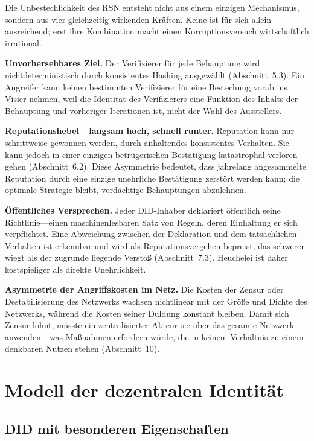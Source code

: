 \documentclass[11pt,a4paper,twocolumn]{article}
\begin{document}
Die Unbestechlichkeit des RSN entsteht nicht aus einem einzigen Mechanismus, sondern aus vier gleichzeitig wirkenden Kräften. Keine ist für sich allein ausreichend; erst ihre Kombination macht einen Korruptionsversuch wirtschaftlich irrational.

\textbf{Unvorhersehbares Ziel.} Der Verifizierer für jede Behauptung wird nichtdeterministisch durch konsistentes Hashing ausgewählt (Abschnitt~5.3). Ein Angreifer kann keinen bestimmten Verifizierer für eine Bestechung vorab ins Visier nehmen, weil die Identität des Verifizierers eine Funktion des Inhalts der Behauptung und vorheriger Iterationen ist, nicht der Wahl des Ausstellers.

\textbf{Reputationshebel---langsam hoch, schnell runter.} Reputation kann nur schrittweise gewonnen werden, durch anhaltendes konsistentes Verhalten. Sie kann jedoch in einer einzigen betrügerischen Bestätigung katastrophal verloren gehen (Abschnitt~6.2). Diese Asymmetrie bedeutet, dass jahrelang angesammelte Reputation durch eine einzige unehrliche Bestätigung zerstört werden kann; die optimale Strategie bleibt, verdächtige Behauptungen abzulehnen.

\textbf{Öffentliches Versprechen.} Jeder DID-Inhaber deklariert öffentlich seine Richtlinie---einen maschinenlesbaren Satz von Regeln, deren Einhaltung er sich verpflichtet. Eine Abweichung zwischen der Deklaration und dem tatsächlichen Verhalten ist erkennbar und wird als Reputationsvergehen bepreist, das schwerer wiegt als der zugrunde liegende Verstoß (Abschnitt~7.3). Heuchelei ist daher kostspieliger als direkte Unehrlichkeit.

\textbf{Asymmetrie der Angriffskosten im Netz.} Die Kosten der Zensur oder Destabilisierung des Netzwerks wachsen nichtlinear mit der Größe und Dichte des Netzwerks, während die Kosten seiner Duldung konstant bleiben. Damit sich Zensur lohnt, müsste ein zentralisierter Akteur sie über das gesamte Netzwerk anwenden---was Maßnahmen erfordern würde, die in keinem Verhältnis zu einem denkbaren Nutzen stehen (Abschnitt~10).

\section{Modell der dezentralen Identität}

\subsection{DID mit besonderen Eigenschaften}
\end{document}
